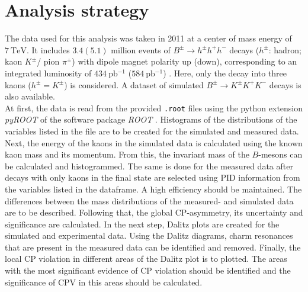 \section{Analysis strategy}
\label{sec:Analysis_strategy}
The data used for this analysis was taken in 2011 at a center of mass energy of $\qty{7}{\tera\eV}$. It includes $\num{3.4}(\num{5.1})$ million events of 
$B^{\pm} \to h^{\pm} h^+ h^-$ decays ($h^{\pm}$: hadron; kaon $K^{\pm}$/ pion {$\pi^{\pm}$}) with dipole magnet polarity up (down), 
corresponding to an integrated luminosity of $\qty{434}{\pico\barn^{-1}}$ ($\qty{584}{\pico\barn^{-1}}$) \cite{LHCb_CPV}. 
Here, only the decay into three kaons ($h^{\pm} =  K^{\pm}$) is considered.
A dataset of simulated $B^{\pm} \to K^{\pm} K^+ K^-$ decays is also available. \\
At first, the data is read from the provided \texttt{.root} files using the python extension \textit{pyROOT} of the software package \textit{ROOT} \cite{ROOT}.
Histograms of the distributions of the variables listed in the file are to be created for the simulated and measured data.
Next, the energy of the kaons in the simulated data is calculated using the known kaon mass and its momentum. From this, the invariant mass of the $B$-mesons can be calculated 
and histogrammed. 
The same is done for the measured data after decays with only kaons in the final state are selected using PID information from the variables listed in the dataframe. 
A high efficiency should be maintained. The differences between the mass distributions of the measured- and simulated data are to be described.
Following that, the global CP-asymmetry, its uncertainty and significance are calculated.
In the next step, Dalitz plots are created for the simulated and experimental data. Using the Dalitz diagrams, charm resonances that are present in the measured data can be 
identified and removed. Finally, the local CP violation in different areas of the Dalitz plot is to plotted. The areas with the most significant evidence of CP violation 
should be identified and the significance of CPV in this areas should be calculated. 
